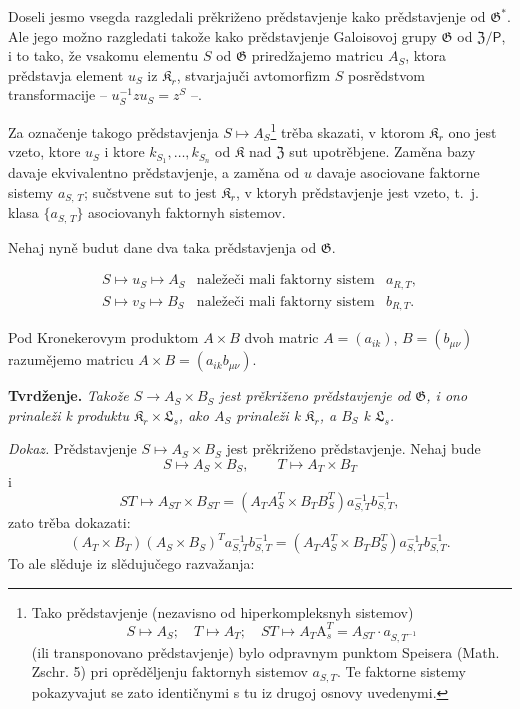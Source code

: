 \documentclass[11pt]{article}
\newcommand{\srcfn}[2]{\footnote{#2}}
\begin{document}
Doseli jesmo vsegda razgledali prěkriženo prědstavjenje kako prědstavjenje od \(\mathfrak{G}^*\). Ale jego možno razgledati takože kako prědstavjenje Galoisovoj grupy \(\mathfrak{G}\) od \(\mathfrak Z/\mathsf{P}\), i to tako, že vsakomu elementu \(S\) od \(\mathfrak{G}\) priredžajemo matricu \(A_S\), ktora prědstavja element \(u_S\) iz \(\mathfrak K_r\), stvarjajuči avtomorfizm \(S\) posrědstvom transformacije -- \(u_S^{-1}zu_S=z^S\) --.

Za označenje takogo prědstavjenja \(S\mapsto A_S\)\srcfn{1}{Tako prědstavjenje (nezavisno od hiperkompleksnyh sistemov)
\[
S\mapsto A_S;\quad T\mapsto A_T;\quad ST\mapsto A_T\mathrm{A}_s^T=A_{ST}\cdot a_{S,T^{-1}}
\]
(ili transponovano prědstavjenje) bylo odpravnym punktom Speisera (Math. Zschr. 5) pri oprěděljenju faktornyh sistemov \(a_{S,T}\). Te faktorne sistemy pokazyvajut se zato identičnymi s tu iz drugoj osnovy uvedenymi.} trěba skazati, v ktorom \(\mathfrak K_r\) ono jest vzeto, ktore \(u_S\) i ktore \(k_{S_1},\ldots,k_{S_n}\) od \(\mathfrak K\) nad \(\mathfrak Z\) sut upotrěbjene. Zaměna bazy davaje ekvivalentno prědstavjenje, a zaměna od \(u\) davaje asociovane faktorne sistemy \(a_{S,\,T}\); sučstvene sut to jest \(\mathfrak K_r\), v ktoryh prědstavjenje jest vzeto, t.~j. klasa \(\{a_{S,\,T}\}\) asociovanyh faktornyh sistemov.

Nehaj nyně budut dane dva taka prědstavjenja od \(\mathfrak G\).

\[
\begin{array}{lll}
S\mapsto u_S\mapsto A_S & \text{naležeči mali faktorny sistem} & a_{R,T},\\
S\mapsto v_S\mapsto B_S & \text{naležeči mali faktorny sistem} & b_{R,T}.
\end{array}
\]

Pod Kronekerovym produktom \(A\times B\) dvoh matric \(A=(a_{ik})\), \(B=(b_{\mu\nu})\) razumějemo matricu \(A\times B=(a_{ik}b_{\mu\nu})\).

\noindent\textbf{Tvrdženje.} \emph{Takože \(S\to A_S\times B_S\) jest prěkriženo prědstavjenje od \(\mathfrak G\), i ono prinaleži k produktu \(\mathfrak K_r\times\mathfrak L_s\), ako \(A_S\) prinaleži k \(\mathfrak K_r\), a \(B_S\) k \(\mathfrak L_s\).}

\noindent\emph{Dokaz.} Prědstavjenje \(S\mapsto A_S\times B_S\) jest prěkriženo prědstavjenje. Nehaj bude
\[
S\mapsto A_S\times B_S,\qquad T\mapsto A_T\times B_T
\]
i
\[
ST\mapsto A_{ST}\times B_{ST}
=(A_TA_S^T\times B_TB_S^T)a_{S,T}^{-1}b_{S,T}^{-1},
\]
zato trěba dokazati:
\[
(A_T\times B_T)(A_S\times B_S)^T a_{S,T}^{-1}b_{S,T}^{-1}
=(A_TA_S^T\times B_TB_S^T)a_{S,T}^{-1}b_{S,T}^{-1}.
\]
To ale slěduje iz slědujučego razvažanja:
\end{document}
